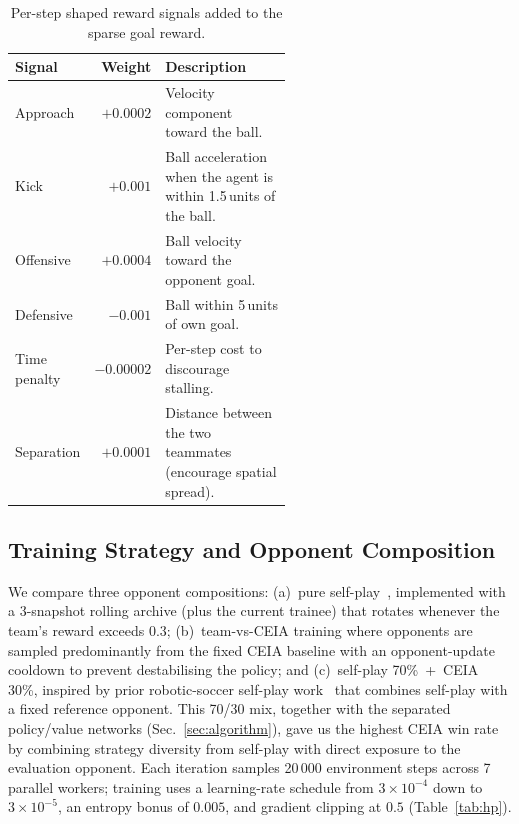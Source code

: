 \documentclass{article}
\begin{document}
\begin{table}[h]
\centering\small
\caption{Per-step shaped reward signals added to the sparse goal reward.}
\label{tab:rewards}
\begin{tabular}{l r p{0.55\linewidth}}
\toprule
Signal & Weight & Description \\
\midrule
Approach     & $+0.0002$  & Velocity component toward the ball. \\
Kick         & $+0.001$   & Ball acceleration when the agent is within 1.5\,units of the ball. \\
Offensive    & $+0.0004$  & Ball velocity toward the opponent goal. \\
Defensive    & $-0.001$   & Ball within 5\,units of own goal. \\
Time penalty & $-0.00002$ & Per-step cost to discourage stalling. \\
Separation   & $+0.0001$  & Distance between the two teammates (encourage spatial spread). \\
\bottomrule
\end{tabular}
\end{table}

\subsection{Training Strategy and Opponent Composition}
\label{sec:training}

We compare three opponent compositions: (a)~pure self-play~\citep{bansal2018emergent},
implemented with a 3-snapshot rolling archive (plus the current trainee) that rotates
whenever the team's reward exceeds 0.3; (b)~team-vs-CEIA training where opponents are sampled
predominantly from the fixed CEIA baseline with an opponent-update cooldown to prevent
destabilising the policy; and (c)~self-play 70\%~+~CEIA 30\%, inspired by prior robotic-soccer self-play
work~\citep{brandao2022marl} that combines self-play with a fixed reference opponent. This 70/30
mix, together with the separated policy/value networks (Sec.~\ref{sec:algorithm}),
gave us the highest CEIA win rate by combining strategy diversity from self-play
with direct exposure to the evaluation opponent. Each iteration samples 20\,000 environment steps across 7 parallel
workers; training uses a learning-rate schedule from $3\!\times\!10^{-4}$ down to
$3\!\times\!10^{-5}$, an entropy bonus of $0.005$, and gradient clipping at $0.5$
(Table~\ref{tab:hp}).
\end{document}
